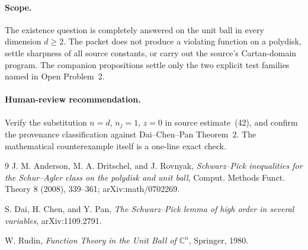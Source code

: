 \documentclass[11pt]{article}
\begin{document}
\paragraph{Scope.}
The existence question is completely answered on the unit ball in every
dimension $d\ge2$.  The packet does not produce a violating function on a
polydisk, settle sharpness of all source constants, or carry out the source's
Cartan-domain program.  The companion propositions settle only the two
explicit test families named in Open Problem~2.

\paragraph{Human-review recommendation.}
Verify the substitution $n=d$, $n_j=1$, $z=0$ in source estimate~(42), and
confirm the provenance classification against Dai--Chen--Pan Theorem~2.  The
mathematical counterexample itself is a one-line exact check.

\begin{thebibliography}{9}
J. M. Anderson, M. A. Dritschel, and J. Rovnyak,
\emph{Schwarz--Pick inequalities for the Schur--Agler class on the polydisk
and unit ball}, Comput. Methods Funct. Theory 8 (2008), 339--361;
arXiv:math/0702269.

S. Dai, H. Chen, and Y. Pan,
\emph{The Schwarz--Pick lemma of high order in several variables},
arXiv:1109.2791.

W. Rudin, \emph{Function Theory in the Unit Ball of $\mathbb C^n$},
Springer, 1980.
\end{thebibliography}
\end{document}
